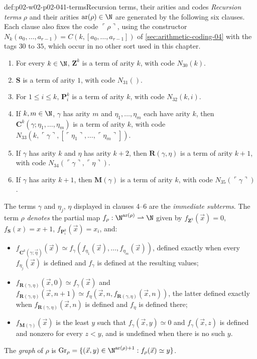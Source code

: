 \begin{hbdefinition}{def:p02-w02-p02-041-terms}{Recursion terms, their arities and codes}
\emph{Recursion terms} \(\rho\) and their arities \(\mathrm{ar}(\rho)\in\N\)
are generated by the following six clauses.  Each clause also fixes the code
\(\ulcorner\rho\urcorner\), using the constructor
\(N_k(a_0,\ldots,a_{r-1})=C(k,[a_0,\ldots,a_{r-1}])\) of
\cref{sec:arithmetic-coding-04} with the tags \(30\) to \(35\), which occur
in no other sort used in this chapter.
\begin{enumerate}
 \item For every \(k\in\N\), \(\mathbf Z^k\) is a term of arity \(k\), with
   code \(N_{30}(k)\).
 \item \(\mathbf S\) is a term of arity \(1\), with code \(N_{31}()\).
 \item For \(1\le i\le k\), \(\mathbf P^k_i\) is a term of arity \(k\), with
   code \(N_{32}(k,i)\).
 \item If \(k,m\in\N\), \(\gamma\) has arity \(m\) and
   \(\eta_1,\ldots,\eta_m\) each have arity \(k\), then
   \(\mathbf C^k(\gamma;\eta_1,\ldots,\eta_m)\) is a term of arity \(k\), with
   code \(N_{33}(k,\ulcorner\gamma\urcorner,[\ulcorner\eta_1\urcorner,\ldots,\ulcorner\eta_m\urcorner])\).
 \item If \(\gamma\) has arity \(k\) and \(\eta\) has arity \(k+2\), then
   \(\mathbf R(\gamma,\eta)\) is a term of arity \(k+1\), with code
   \(N_{34}(\ulcorner\gamma\urcorner,\ulcorner\eta\urcorner)\).
 \item If \(\gamma\) has arity \(k+1\), then \(\mathbf M(\gamma)\) is a term
   of arity \(k\), with code \(N_{35}(\ulcorner\gamma\urcorner)\).
\end{enumerate}
The terms \(\gamma\) and \(\eta_j\), \(\eta\) displayed in clauses 4--6 are the
\emph{immediate subterms}.  The term \(\rho\) \emph{denotes} the partial map
\(f_\rho:\N^{\mathrm{ar}(\rho)}\rightharpoonup\N\) given by
\(f_{\mathbf Z^k}(\vec x)=0\), \(f_{\mathbf S}(x)=x+1\),
\(f_{\mathbf P^k_i}(\vec x)=x_i\), and:
\begin{itemize}
 \item \(f_{\mathbf C^k(\gamma;\vec\eta)}(\vec x)\simeq
   f_\gamma(f_{\eta_1}(\vec x),\ldots,f_{\eta_m}(\vec x))\), defined exactly
   when every \(f_{\eta_j}(\vec x)\) is defined and \(f_\gamma\) is defined at
   the resulting values;
 \item \(f_{\mathbf R(\gamma,\eta)}(\vec x,0)\simeq f_\gamma(\vec x)\) and
   \(f_{\mathbf R(\gamma,\eta)}(\vec x,n+1)\simeq
   f_\eta(\vec x,n,f_{\mathbf R(\gamma,\eta)}(\vec x,n))\), the latter defined
   exactly when \(f_{\mathbf R(\gamma,\eta)}(\vec x,n)\) is defined and
   \(f_\eta\) is defined there;
 \item \(f_{\mathbf M(\gamma)}(\vec x)\) is the least \(y\) such that
   \(f_\gamma(\vec x,y)\simeq0\) and \(f_\gamma(\vec x,z)\) is defined and
   nonzero for every \(z<y\), and is undefined when there is no such \(y\).
\end{itemize}
The \emph{graph} of \(\rho\) is
\(\mathrm{Gr}_\rho=\{(\vec x,y)\in\N^{\mathrm{ar}(\rho)+1}:f_\rho(\vec x)\simeq y\}\).
\end{hbdefinition}

